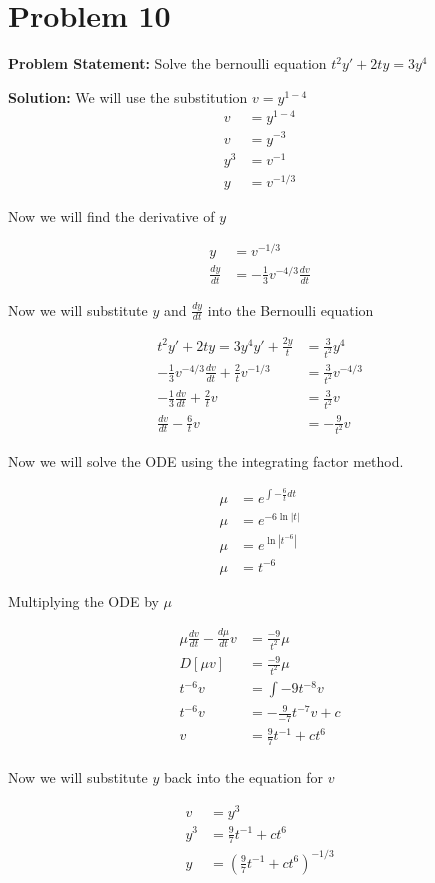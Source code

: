 \documentclass[12pt, letterpaper]{article}
\begin{document}
\section*{Problem 10}

\textbf{Problem Statement:} Solve the bernoulli equation $t^2y' + 2ty = 3y^4$

\textbf{Solution:} We will use the substitution $v = y^{1-4}$
\begin{align*}
    v &= y^{1-4} \\
    v &= y^{-3} \\
    y^3 &= v^{-1} \\
    y &= v^{-1/3}
\end{align*}

Now we will find the derivative of $y$

\begin{align*}
    y &= v^{-1/3} \\
    \frac{dy}{dt} &= -\frac{1}{3}v^{-4/3}\frac{dv}{dt}
\end{align*}

Now we will substitute $y$ and $\frac{dy}{dt}$ into the Bernoulli equation

\begin{align*}
    t^2y' + 2ty = 3y^4
    y' + \frac{2y}{t} &= \frac{3}{t^2}y^4 \\
    -\frac{1}{3}v^{-4/3}\frac{dv}{dt} + \frac{2}{t}v^{-1/3} &= \frac{3}{t^2}v^{-4/3} \\
    -\frac{1}{3}\frac{dv}{dt} + \frac{2}{t}v &= \frac{3}{t^2}v \\
    \frac{dv}{dt} - \frac{6}{t}v &= -\frac{9}{t^2}v
\end{align*}

Now we will solve the ODE using the integrating factor method.

\begin{align*}
    \mu &= e^{\int -\frac{6}{t}dt} \\
    \mu &= e^{-6\ln|t|} \\
    \mu &= e^{\ln|t^{-6}|} \\
    \mu &= t^{-6}
\end{align*}

Multiplying the ODE by $\mu$

\begin{align*}
    \mu \frac{dv}{dt} - \frac{d\mu}{dt}v &= \frac{-9}{t^2} \mu \\
    D[\mu v] &= \frac{-9}{t^2} \mu \\
    t^{-6}v &= \int -9t^{-8}v \\
    t^{-6}v &= -\frac{9}{-7}t^{-7}v + c \\
    v &= \frac{9}{7}t^{-1} + ct^6 \\
\end{align*}

Now we will substitute $y$ back into the equation for $v$

\begin{align*}
    v &= y^3 \\
    y^3 &= \frac{9}{7}t^{-1} + ct^6 \\
    y &= (\frac{9}{7}t^{-1}+ ct^6)^{-1/3}
\end{align*}
\end{document}
